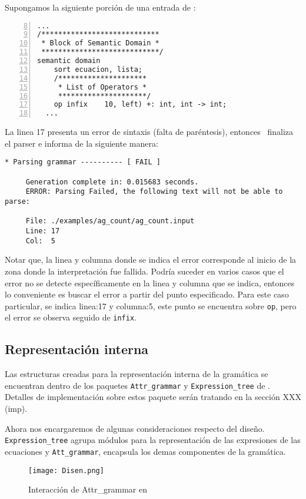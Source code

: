 Supongamos la siguiente porción de una entrada de \maggen:

\begin{lstlisting}[numbers=left, numberstyle=\tiny, numbersep=5pt, firstnumber=8, language=cobol, linewidth=12cm]
  ...
/****************************
 * Block of Semantic Domain *
 ****************************/
semantic domain
    sort ecuacion, lista;
    /*********************
     * List of Operators *
     *********************/
    op infix    10, left) +: int, int -> int;
  ...
\end{lstlisting}
La linea 17 presenta un error de sintaxis (falta de paréntesis), entonces \maggen\ finaliza el parser e informa de la siguiente manera:
\begin{lstlisting}[backgroundcolor=\color{white}, linewidth=15cm]
     * Parsing grammar ---------- [ FAIL ]

     Generation complete in: 0.015683 seconds.
     ERROR: Parsing Failed, the following text will not be able to parse:

     File: ./examples/ag_count/ag_count.input
     Line: 17
     Col:  5
\end{lstlisting}
Notar que, la linea y columna donde se indica el error corresponde al inicio de la zona donde la interpretación fue fallida. Podría suceder en varios casos que el error no se detecte específicamente en la linea y columna que se indica, entonces lo conveniente es buscar el error a partir del punto especificado. Para este caso particular, se indica linea:17 y columna:5, este punto se encuentra sobre \texttt{op}, pero el error se observa seguido de \texttt{infix}.

\subsection*{Representación interna}
Las estructuras creadas para la representación interna de la gramática se encuentran dentro de los paquetes \texttt{Attr\_grammar} y \texttt{Expression\_tree} de \maggen. Detalles de implementación sobre estos paquete serán tratando en la sección XXX (imp). 

Ahora nos encargaremos de algunas consideraciones respecto del diseño. 
\texttt{Expression\_tree} agrupa módulos para la representación de las expresiones de las ecuaciones y \texttt{Att\_grammar}, encapsula los demas componentes de la gramática.
\begin{figure}\centering
\texttt{[image: Disen.png]}
\caption{\label{fig:disen}Interacción de Attr\_grammar en \maggen}
\end{figure}

